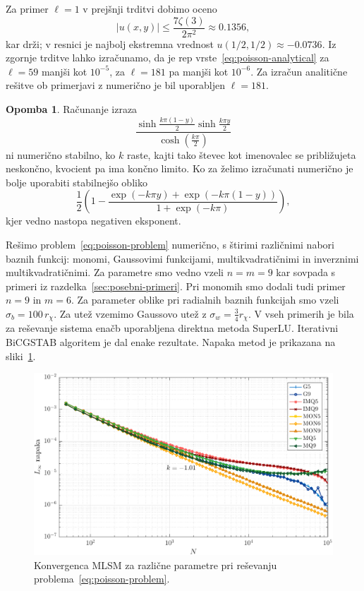 \documentclass[12pt,a4paper,twoside]{article}
\theoremstyle{definition} %
\newtheorem{opomba}[definicija]{Opomba}
\theoremstyle{plain} %
\numberwithin{equation}{section}
\newlength{\iw}
\begin{document}
Za primer $\ell = 1$  v prejšnji trditvi dobimo oceno
\[
  |u(x, y)| \leq \frac{7 \zeta(3)}{2 \pi^2} \approx 0.1356,
\]
kar drži; v resnici je najbolj ekstremna vrednost $u(1/2, 1/2) \approx -0.0736$.
Iz zgornje trditve lahko izračunamo, da je rep
vrste~\eqref{eq:poisson-analytical} za $\ell = 59$ manjši kot $10^{-5}$, za
$\ell = 181$ pa manjši kot $10^{-6}$.  Za izračun analitične rešitve ob
primerjavi z numerično je bil uporabljen $\ell = 181$.
\begin{opomba}
  Računanje izraza \[
    \frac{\sinh \frac{k \pi  (1-y)}{2} \sinh \frac{k \pi
    y}{2}}{\cosh(\frac{k\pi}{2})}
  \] ni numerično stabilno, ko $k$ raste, kajti tako števec kot imenovalec se
  približujeta neskončno, kvocient pa ima končno limito. Ko za želimo izračunati
  numerično je bolje uporabiti stabilnejšo obliko
  \[
    \frac12\left( 1 - \frac{\exp(-k\pi y) + \exp(-k\pi(1-y)) }{1 +
    \exp(-k\pi)}\right),
  \]
  kjer vedno nastopa negativen eksponent.
\end{opomba}

Rešimo problem~\eqref{eq:poisson-problem} numerično, s štirimi različnimi nabori
baznih funkcij: monomi, Gaussovimi funkcijami, multikvadratičnimi in inverznimi
multikvadratičnimi. Za parametre smo vedno vzeli $n = m = 9$
kar sovpada s primeri iz razdelka~\ref{sec:posebni-primeri}. Pri monomih smo
dodali tudi primer $n = 9$ in $m = 6$. Za parameter oblike
pri radialnih baznih funkcijah smo vzeli $\sigma_b = 100\, r_\chi$.
Za utež vzemimo Gaussovo utež z $\sigma_w = \frac34 r_\chi$.
V vseh primerih je bila za reševanje sistema enačb uporabljena direktna metoda
SuperLU. Iterativni BiCGSTAB algoritem je dal enake rezultate.  Napaka metod je
prikazana na sliki~\ref{fig:poisson-square-convergence}.

\begin{figure}[h]
  \centering
  \includegraphics[width=\iw]{images/poisson_square_convergence.pdf}
  \caption{Konvergenca MLSM za različne parametre pri reševanju problema~\eqref{eq:poisson-problem}.}
  \label{fig:poisson-square-convergence}
\end{figure}
\end{document}
